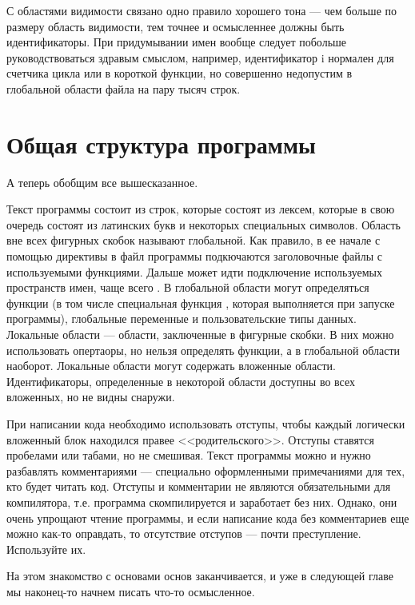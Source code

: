 \documentclass{article}
\begin{document}

С областями видимости связано одно правило хорошего тона --- чем больше по размеру область видимости, тем точнее и осмысленнее должны быть идентификаторы. При придумывании имен вообще следует побольше руководствоваться здравым смыслом, например, идентификатор i нормален для счетчика цикла или в короткой функции, но совершенно недопустим в глобальной области файла на пару тысяч строк.

\section*{Общая структура программы}

А теперь обобщим все вышесказанное.

Текст программы состоит из строк, которые состоят из лексем, которые в свою очередь состоят из латинских букв и некоторых специальных символов. Область вне всех фигурных скобок называют глобальной. Как правило, в ее начале с помощью директивы  в файл программы подкючаются заголовочные файлы с используемыми функциями. Дальше может идти подключение используемых пространств имен, чаще всего . В глобальной области могут определяться функции (в том числе специальная функция , которая выполняется при запуске программы), глобальные переменные и пользовательские типы данных. Локальные области --- области, заключенные в фигурные скобки. В них можно использовать опертаоры, но нельзя определять функции, а в глобальной области наоборот. Локальные области могут содержать вложенные области. Идентификаторы, определенные в некоторой области доступны во всех вложенных, но не видны снаружи.

При написании кода необходимо использовать отступы, чтобы каждый логически вложенный блок находился правее <<родительского>>. Отступы ставятся пробелами или табами, но не смешивая. Текст программы можно и нужно разбавлять комментариями --- специально оформленными примечаниями для тех, кто будет читать код. Отступы и комментарии не являются обязательными для компилятора, т.е. программа скомпилируется и заработает без них. Однако, они очень упрощают чтение программы, и если написание кода без комментариев еще можно как-то оправдать, то отсутствие отступов --- почти преступление. Используйте их.

На этом знакомство с основами основ заканчивается, и уже в следующей главе мы наконец-то начнем писать что-то осмысленное.
\end{document}
